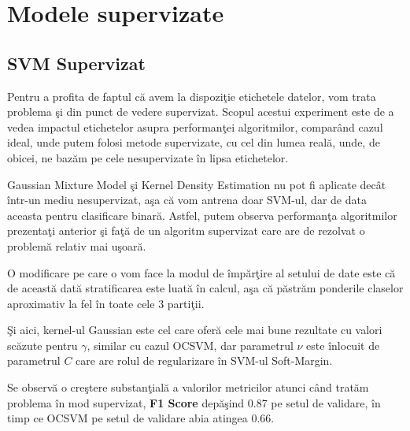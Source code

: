 \section{Modele supervizate}

\subsection{SVM Supervizat}

Pentru a profita de faptul că avem la dispoziţie etichetele datelor, vom trata 
problema şi din punct de vedere supervizat. Scopul acestui experiment
este de a vedea impactul etichetelor asupra performanţei algoritmilor, 
comparând cazul ideal, unde putem folosi metode supervizate, cu cel din lumea reală,
unde, de obicei, ne bazăm pe cele nesupervizate în lipsa etichetelor.

Gaussian Mixture Model şi Kernel 
Density Estimation nu pot fi aplicate decât într-un mediu nesupervizat, aşa 
că vom antrena doar SVM-ul, dar de data aceasta pentru clasificare binară.
Astfel, putem observa performanţa algoritmilor prezentaţi anterior şi faţă 
de un algoritm supervizat care are de rezolvat o problemă relativ mai uşoară.

O modificare pe care o vom face la modul de împărţire al setului de date 
este că de această dată stratificarea este luată în calcul, aşa că păstrăm 
ponderile claselor aproximativ la fel în toate cele 3 partiţii.

Şi aici, kernel-ul Gaussian este cel care oferă cele mai bune rezultate cu 
valori scăzute pentru $\gamma$, similar cu cazul OCSVM, dar parametrul 
$\nu$ este înlocuit
de parametrul $C$ care are rolul de regularizare în SVM-ul Soft-Margin.

Se observă o creştere substanţială a valorilor metricilor atunci când tratăm 
problema în mod supervizat, \textbf{F1 Score} 
depăşind 0.87 pe setul de validare, în timp ce 
OCSVM pe setul de validare abia atingea 0.66.

